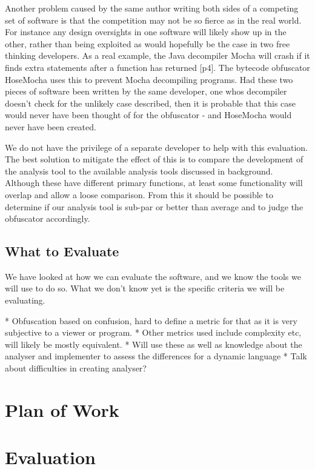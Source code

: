 \documentclass{report}
\begin{document}
Another problem caused by the same author writing both sides of a competing set of software is that the competition
may not be so fierce as in the real world. For instance any design oversights in one software will likely show up
in the other, rather than being exploited as would hopefully be the case in two free thinking developers. As a real
example, the Java decompiler Mocha will crash if it finds extra statements after a function has returned
\cite{hosemocha}[p4]. The bytecode obfuscator HoseMocha uses this to prevent Mocha decompiling programs. Had these two
pieces of software been written by the same developer, one whos decompiler doesn't check for the unlikely case described,
then it is probable that this case would never have been thought of for the obfuscator - and HoseMocha would never have
been created.

We do not have the privilege of a separate developer to help with this evaluation. The best solution to mitigate the effect
of this is to compare the development of the analysis tool to the available analysis tools discussed in background. Although
these have different primary functions, at least some functionality will overlap and allow a loose comparison. From this it
should be possible to determine if our analysis tool is sub-par or better than average and to judge the obfuscator
accordingly.

\subsection{What to Evaluate}

We have looked at how we can evaluate the software, and we know the tools we will use to do so. What we don't know yet is
the specific criteria we will be evaluating. 

* Obfuscation based on confusion, hard to define a metric for that as it is very subjective to a viewer or program.
* Other metrics used include complexity etc, will likely be mostly equivalent.
* Will use these as well as knowledge about the analyser and implementer to assess the differences for a dynamic language
* Talk about difficulties in creating analyser?

\section{Plan of Work}

\section{Evaluation}
\end{document}
